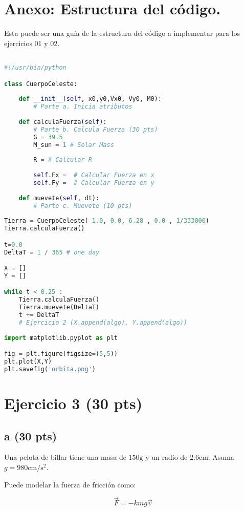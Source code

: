 \documentclass{article}
\begin{document}
\section*{Anexo: Estructura del código.}
Esta puede ser una guía de la estructura del código a implementar para los ejercicios 01 y 02.


\begin{lstlisting}[language=Python, caption=Estructura del ejercicio 2.]

#!/usr/bin/python

class CuerpoCeleste:
    
    def __init__(self, x0,y0,Vx0, Vy0, M0):
        # Parte a. Inicia atributos
        
    def calculaFuerza(self):
        # Parte b. Calcula Fuerza (30 pts)
        G = 39.5
        M_sun = 1 # Solar Mass
        
        R = # Calcular R
        
        self.Fx =  # Calcular Fuerza en x
        self.Fy =  # Calcular Fuerza en y
            
    def muevete(self, dt):
        # Parte c. Muevete (10 pts)
        
Tierra = CuerpoCeleste( 1.0, 0.0, 6.28 , 0.0 , 1/333000)
Tierra.calculaFuerza()

t=0.0
DeltaT = 1 / 365 # one day

X = []
Y = []

while t < 0.25 :
    Tierra.calculaFuerza()
    Tierra.muevete(DeltaT)
    t += DeltaT
    # Ejercicio 2 (X.append(algo), Y.append(algo))
    
import matplotlib.pyplot as plt

fig = plt.figure(figsize=(5,5))
plt.plot(X,Y)
plt.savefig('orbita.png')
\end{lstlisting}

\section*{Ejercicio 3 (30 pts)}
\subsection*{a (30 pts)}
Una pelota de billar tiene una masa de $150\mathrm{g}$ y
un radio de $2.6\mathrm{cm}$. Asuma $g = 980 \mathrm{cm/s^2}$.

Puede modelar la fuerza de fricción como:

\[ \vec{F} =  - k m g \vec{v}\]
\end{document}
